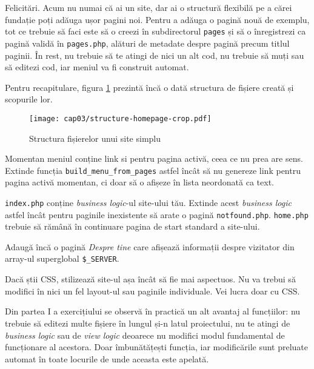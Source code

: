 Felicitări. Acum nu numai că ai un site, dar ai o structură
flexibilă pe a cărei fundație poți adăuga ușor pagini noi.
Pentru a adăuga o pagină nouă de exemplu, tot ce trebuie
să faci este să o creezi în subdirectorul \texttt{pages}
și să o înregistrezi ca pagină validă în \texttt{pages.php},
alături de metadate despre pagină precum titlul paginii.
În rest, nu trebuie să te atingi de nici un alt cod,
nu trebuie să muți sau să editezi cod, iar meniul va fi
construit automat.

Pentru recapitulare, figura \ref{fig:filestruct-homepage}
prezintă încă o dată structura de fișiere creată
și scopurile lor.

\begin{figure}[H]
  \centering
    \texttt{[image: cap03/structure-homepage-crop.pdf]}
  \caption{Structura fișierelor unui site simplu}
  \label{fig:filestruct-homepage}
\end{figure}

\begin{Exercise}[title={Îmbunătățește-ți pagina personală},difficulty=1]
\ExePart
Momentan meniul conține link  si pentru pagina activă,
ceea ce nu prea are sens. Extinde funcția
\texttt{build\_menu\_from\_pages} astfel încât să
nu genereze link pentru pagina activă momentan, ci
doar să o afișeze în lista neordonată ca text.

\ExePart
\texttt{index.php} conține \textit{business logic}-ul site-ului tău.
Extinde acest \textit{business logic} astfel încât pentru
paginile inexistente să arate o pagină \texttt{notfound.php}.
\texttt{home.php} trebuie să rămână în continuare pagina de
start standard a site-ului.

\ExePart
Adaugă încă o pagină \textit{Despre tine}
care afișează informații despre vizitator din array-ul superglobal
\texttt{\$\_SERVER}.

Dacă știi CSS, stilizează site-ul așa încât să fie mai aspectuos.
Nu va trebui să modifici în nici un fel layout-ul sau
paginile individuale. Vei lucra doar cu CSS.
\end{Exercise}

Din partea I a exercițiului se observă în practică un alt avantaj
al funcțiilor: nu trebuie să editezi multe fișiere în lungul
și-n latul proiectului, nu te atingi de \textit{business logic}
sau de \textit{view logic} deoarece nu modifici modul fundamental de funcționare
al acestora. Doar îmbunătățești funcția, iar
modificările sunt preluate automat în toate locurile de unde
aceasta este apelată.

